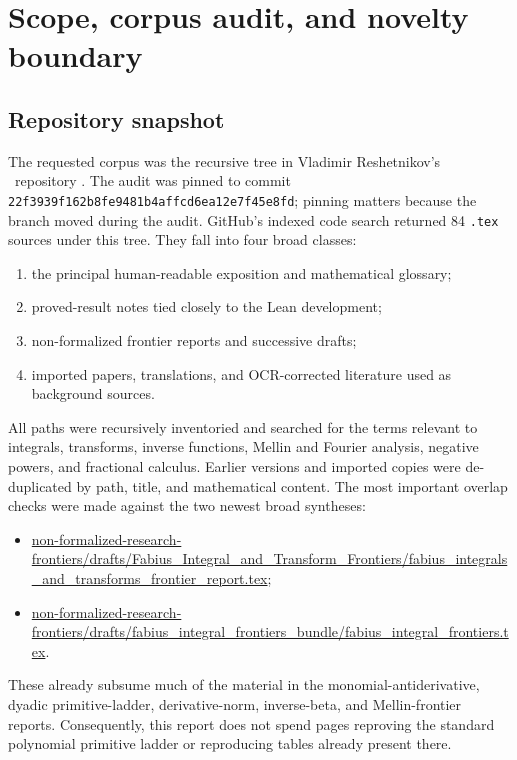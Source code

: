 \documentclass[11pt,oneside]{article}
\theoremstyle{definition}
\theoremstyle{remark}
\newcommand{\1}{\mathbf 1}
\begin{document}
\newpage

\section{Scope, corpus audit, and novelty boundary}
\label{p11:sec:scope}

\subsection{Repository snapshot}

The requested corpus was the recursive tree
 in Vladimir Reshetnikov's
\repoPartvvv\ repository \cite{p11:ProveIt}.  The audit was pinned to commit
\texttt{22f3939f162b8fe9481b4\allowbreak affcd6ea12e7f45e8fd}; pinning matters because the
branch moved during the audit.  GitHub's indexed code search returned 84
\texttt{.tex} sources under this tree.  They fall into four broad classes:

\begin{enumerate}
\item the principal human-readable exposition and mathematical glossary;
\item proved-result notes tied closely to the Lean development;
\item non-formalized frontier reports and successive drafts;
\item imported papers, translations, and OCR-corrected literature used as
      background sources.
\end{enumerate}

All paths were recursively inventoried and searched for the terms relevant to
integrals, transforms, inverse functions, Mellin and Fourier analysis,
negative powers, and fractional calculus.  Earlier versions and imported
copies were de-duplicated by path, title, and mathematical content.  The most
important overlap checks were made against the two newest broad syntheses:

\begin{itemize}
\item \url{non-formalized-research-frontiers/drafts/Fabius_Integral_and_Transform_Frontiers/fabius_integrals_and_transforms_frontier_report.tex};
\item \url{non-formalized-research-frontiers/drafts/fabius_integral_frontiers_bundle/fabius_integral_frontiers.tex}.
\end{itemize}

These already subsume much of the material in the monomial-antiderivative,
dyadic primitive-ladder, derivative-norm, inverse-beta, and Mellin-frontier
reports.  Consequently, this report does not spend pages reproving the
standard polynomial primitive ladder or reproducing tables already present
there.
\end{document}

